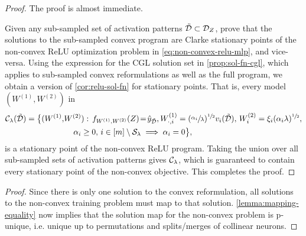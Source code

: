 \stationaryPoints*
\begin{proof}
    The proof is almost immediate.

    Given any sub-sampled set of activation patterns \( \tilde {\mathcal{D}} \subset \mathcal{D}_Z \),
    \citet[Theorem 3]{wang2022hidden} prove that the solutions to the sub-sampled
    convex program are Clarke stationary points \citep{clarke1990optimization} of
    the non-convex ReLU optimization problem in \cref{eq:non-convex-relu-mlp},
    and vice-versa.
    Using the expression for the CGL solution set in \cref{prop:sol-fn-cgl},
    which applies to sub-sampled convex reformulations as well as the full
    program, we obtain a version of \cref{cor:relu-sol-fn} for stationary
    points.
    That is, every model \( (W^{(1)}, W^{(2)}) \) in
    \begin{equation*}
        \begin{aligned}
            \mathcal{C}_\lambda(\tilde {\mathcal{D}}) = \big\{
             & (W^{(1)}, \! W^{(2)}) :
            \, f_{W^{(1)}, W^{(2)}}(Z) \! = \! \hat y_{\tilde {\mathcal{D}}},
            W^{(1)}_{\cdot, i} = (\sfrac{\alpha_{i}}{\lambda})^{\sfrac{1}{2}} v_i(\tilde {\mathcal{D}}), \,
            W^{(2)}_{i} = \xi_i (\alpha_i \lambda)^{\sfrac{1}{2}},                                      \\
             & \hspace{4em} \alpha_i \geq 0, \, i \in [m] \setminus \mathcal{S}_\lambda \implies \alpha_i = 0
            \big\},
        \end{aligned}
    \end{equation*}
    is a stationary point of the non-convex ReLU program.
    Taking the union over all sub-sampled sets of activation patterns
    gives \( \mathcal{C}_\lambda \), which is guaranteed to contain every stationary
    point of the non-convex objective.
    This completes the proof.
\end{proof}

\pUnique*
\begin{proof}
    Since there is only one solution to the convex reformulation, all solutions to the
    non-convex training problem must map to that solution.
    \cref{lemma:mapping-equality} now implies that the solution map for the
    non-convex problem is p-unique, i.e. unique up to permutations and
    splits/merges of collinear neurons.
\end{proof}

